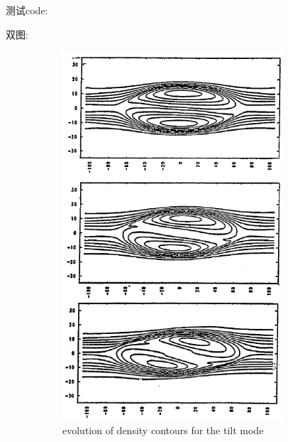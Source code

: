 \documentclass{article}
\begin{document}
测试code:



双图:
\begin{figure}[!hbtp]
    \centering
    \begin{subfigure}[b]{0.45\textwidth}
    \centering
    \includegraphics[width=0.9\textwidth]{figs/tilt.png} 
    \caption{evolution of density contours for the tilt mode}
    \label{fig: tilt}
    \end{subfigure}
    \hfill %
    \begin{subfigure}[b]{0.45\textwidth}
    \centering

\end{subfigure}
\end{figure}
\end{document}
